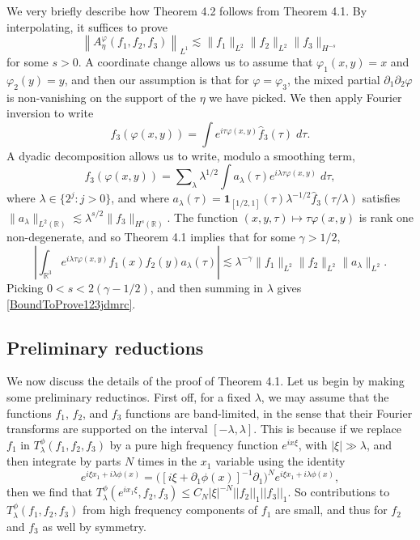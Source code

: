 \documentclass[12pt]{amsart}
\newcommand*{\R}{\mathbb{R}}
\begin{document}
We very briefly describe how Theorem 4.2 follows from Theorem 4.1. By interpolating, it suffices to prove
%
\begin{equation} \label{BoundToProve123jdmrc}
        \left\| A^\varphi_\eta(f_1,f_2,f_3) \right\|_{L^1} \lesssim \| f_1 \|_{L^2} \| f_2 \|_{L^2} \| f_3 \|_{H^{-s}}
\end{equation}
%
for some $s > 0$. A coordinate change allows us to assume that $\varphi_1(x,y) = x$ and $\varphi_2(y) = y$, and then our assumption is that for $\varphi = \varphi_3$, the mixed partial $\partial_1 \partial_2 \varphi$ is non-vanishing on the support of the $\eta$ we have picked. We then apply Fourier inversion to write
%
\begin{equation}
    f_3(\varphi(x,y)) = \int e^{i \tau \varphi(x,y)} \widehat{f}_3(\tau)\; d\tau.
\end{equation}
%
A dyadic decomposition allows us to write, modulo a smoothing term,
%
\begin{equation}
    f_3(\varphi(x,y)) = \sum\nolimits_\lambda \lambda^{1/2} \int a_\lambda( \tau ) e^{i \lambda \tau \varphi(x,y)}\; d\tau,
\end{equation}
%
where $\lambda \in \{ 2^j : j > 0 \}$, and where $a_\lambda(\tau) = \boldsymbol{1}_{[1/2,1]}(\tau) \lambda^{-1/2} \widehat{f}_3( \tau / \lambda) $ satisfies $\| a_\lambda \|_{L^2(\R)} \lesssim \lambda^{s/2} \| f_3 \|_{H^s(\R)}$. The function $(x,y,\tau) \mapsto \tau \varphi(x,y)$ is rank one non-degenerate, and so Theorem 4.1 implies that for some $\gamma > 1/2$,
%
\begin{equation}
    \left| \int_{\R^3} e^{i \lambda \tau \varphi(x,y)} f_1(x) f_2(y) a_\lambda(\tau) \right| \lesssim \lambda^{-\gamma} \| f_1 \|_{L^2} \| f_2 \|_{L^2} \| a_\lambda \|_{L^2}.
\end{equation}
%
Picking $0 < s < 2(\gamma - 1/2)$, and then summing in $\lambda$ gives \eqref{BoundToProve123jdmrc}.

\subsection{Preliminary reductions}

We now discuss the details of the proof of Theorem 4.1. Let us begin by making some preliminary reductinos. First off, for a fixed $\lambda$, we may assume that the functions $f_1$, $f_2$, and $f_3$ functions are band-limited, in the sense that their Fourier transforms are supported on the interval $[-\lambda, \lambda]$. This is because if we replace $f_1$ in $T^\phi_\lambda(f_1,f_2,f_3)$ by a pure high frequency function $e^{ix\xi}$, with $|\xi| \gg \lambda$, and then integrate by parts $N$ times in the $x_1$ variable using the identity
%
\begin{equation*}
    e^{i\xi x_1+i\lambda \phi(x)}= \big( [i\xi+ \partial_1 \phi (x)]^{-1} \partial_1 \big)^N e^{i\xi x_1+i\lambda \phi(x)},
\end{equation*}
%
then we find that $T_\lambda^\phi(e^{ix_1 \xi},f_2,f_3)\leq C_N|\xi|^{-N}||f_2||_1 ||f_3||_1$. So contributions to $T^\phi_\lambda(f_1,f_2,f_3)$ from high frequency components of $f_1$ are small, and thus for $f_2$ and $f_3$ as well by symmetry.
\end{document}
